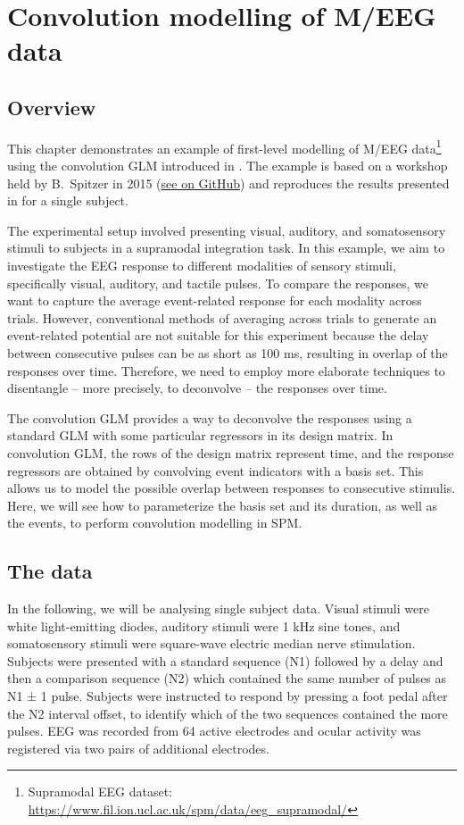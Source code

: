 \chapter{Convolution modelling of M/EEG data \label{Chap:data:meeg_artefact}}

\section{Overview}
	This chapter demonstrates an example of first-level modelling of M/EEG data\footnote{Supramodal EEG dataset: \url{https://www.fil.ion.ucl.ac.uk/spm/data/eeg_supramodal/}} using the convolution GLM introduced in \cite{Litvak_ConvModel_2013}. The example is based on a workshop held by B.\ Spitzer in 2015 (\href{https://github.com/bernspitz/convolution-models-MEEG}{see on GitHub}) and reproduces the results presented in \cite{spitzer2016rhythmic} for a single subject. 

	The experimental setup involved presenting visual, auditory, and somatosensory stimuli to subjects in a supramodal integration task. In this example, we aim to investigate the EEG response to different modalities of sensory stimuli, specifically visual, auditory, and tactile pulses. To compare the responses, we want to capture the average event-related response for each modality across trials. However, conventional methods of averaging across trials to generate an event-related potential are not suitable for this experiment because the delay between consecutive pulses can be as short as 100 ms, resulting in overlap of the responses over time. Therefore, we need to employ more elaborate techniques to disentangle -- more precisely, to deconvolve -- the responses over time.

	The convolution GLM provides a way to deconvolve the responses using a standard GLM with some particular regressors in its design matrix. In convolution GLM, the rows of the design matrix represent time, and the response regressors are obtained by convolving event indicators with a basis set. This allows us to model the possible overlap between responses to consecutive stimulis. Here, we will see how to parameterize the basis set and its duration, as well as the events, to perform convolution modelling in SPM. 


\section{The data}
	In the following, we will be analysing single subject data. Visual stimuli were white light-emitting diodes, auditory stimuli were 1 kHz sine tones, and somatosensory stimuli were square-wave electric median nerve stimulation. Subjects were presented with a standard sequence (N1) followed by a delay and then a comparison sequence (N2) which contained the same number of pulses as N1 ± 1 pulse. Subjects were instructed to respond by pressing a foot pedal after the N2 interval offset, to identify which of the two sequences contained the more pulses. EEG was recorded from 64 active electrodes and ocular activity was registered via two pairs of additional electrodes.

